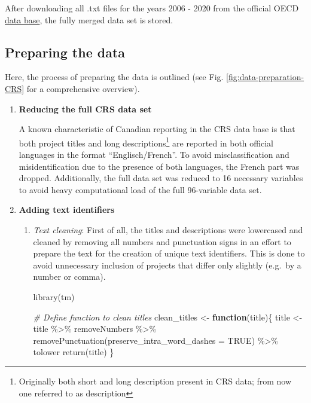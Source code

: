 \documentclass[
]{article}
\newenvironment{Shaded}{\begin{snugshade}}{\end{snugshade}}
\newcommand{\AttributeTok}[1]{\textcolor[rgb]{0.77,0.63,0.00}{#1}}
\newcommand{\CommentTok}[1]{\textcolor[rgb]{0.56,0.35,0.01}{\textit{#1}}}
\newcommand{\ConstantTok}[1]{\textcolor[rgb]{0.00,0.00,0.00}{#1}}
\newcommand{\ControlFlowTok}[1]{\textcolor[rgb]{0.13,0.29,0.53}{\textbf{#1}}}
\newcommand{\FunctionTok}[1]{\textcolor[rgb]{0.00,0.00,0.00}{#1}}
\newcommand{\NormalTok}[1]{#1}
\newcommand{\OtherTok}[1]{\textcolor[rgb]{0.56,0.35,0.01}{#1}}
\newcommand{\SpecialCharTok}[1]{\textcolor[rgb]{0.00,0.00,0.00}{#1}}
\begin{document}
After downloading all .txt files for the years 2006 - 2020 from the official OECD \href{https://stats.oecd.org/DownloadFiles.aspx?DatasetCode=CRS1}{data base}, the fully merged data set is stored.

\hypertarget{preparing-the-data}{%
\subsection{Preparing the data}\label{preparing-the-data}}

Here, the process of preparing the data is outlined (see Fig. \ref{fig:data-preparation-CRS} for a comprehensive overview).

\begin{enumerate}
\def\labelenumi{\arabic{enumi}.}
\item
  \textbf{Reducing the full CRS data set}

  A known characteristic of Canadian reporting in the CRS data base is that both project titles and long descriptions\footnote{Originally both short and long description present in CRS data; from now one referred to as description} are reported in both official languages in the format ``Englisch/French''. To avoid misclassification and misidentification due to the presence of both languages, the French part was dropped. Additionally, the full data set was reduced to 16 necessary variables to avoid heavy computational load of the full 96-variable data set.
\item
  \textbf{Adding text identifiers}

  \begin{enumerate}
  \def\labelenumii{\roman{enumii}.}
  \item
    \emph{Text cleaning}: First of all, the titles and descriptions were lowercased and cleaned by removing all numbers and punctuation signs in an effort to prepare the text for the creation of unique text identifiers. This is done to avoid unnecessary inclusion of projects that differ only slightly (e.g.~by a number or comma).

\begin{Shaded}
\begin{Highlighting}[]
\FunctionTok{library}\NormalTok{(tm)}

\CommentTok{\# Define function to clean titles}
\NormalTok{clean\_titles }\OtherTok{\textless{}{-}} \ControlFlowTok{function}\NormalTok{(title)\{}
\NormalTok{  title }\OtherTok{\textless{}{-}}\NormalTok{ title }\SpecialCharTok{\%\textgreater{}\%} 
\NormalTok{    removeNumbers }\SpecialCharTok{\%\textgreater{}\%}
    \FunctionTok{removePunctuation}\NormalTok{(}\AttributeTok{preserve\_intra\_word\_dashes =} \ConstantTok{TRUE}\NormalTok{) }\SpecialCharTok{\%\textgreater{}\%}
\NormalTok{    tolower}
  \FunctionTok{return}\NormalTok{(title)}
\NormalTok{\}}


\end{Highlighting}
\end{Shaded}
\end{enumerate}
\end{enumerate}
\end{document}

